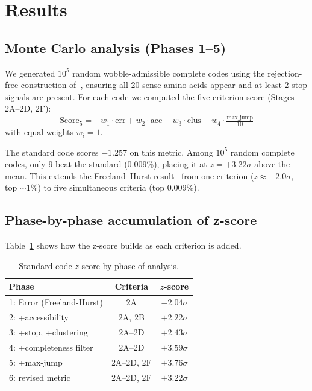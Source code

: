 \documentclass[10pt,twocolumn]{article}
\begin{document}
\section{Results}

\subsection{Monte Carlo analysis (Phases 1--5)}

We generated $10^5$ random wobble-admissible complete codes using the
rejection-free construction of~\cite{codon_code}, ensuring all 20 sense amino
acids appear and at least 2 stop signals are present. For each code we computed
the five-criterion score (Stages 2A--2D, 2F):
\[
\text{Score}_5 = -w_1 \cdot \text{err} + w_2 \cdot \text{acc} +
                 w_3 \cdot \text{clus} - w_4 \cdot \tfrac{\text{max\_jump}}{10}
\]
with equal weights $w_i = 1$.

The standard code scores $-1.257$ on this metric. Among $10^5$ random complete
codes, only 9 beat the standard (0.009\%), placing it at $z = +3.22\sigma$
above the mean. This extends the Freeland--Hurst result~\cite{FreelandHurst1998}
from one criterion ($z \approx -2.0\sigma$, top $\sim\!1\%$) to five
simultaneous criteria (top $0.009\%$).

\subsection{Phase-by-phase accumulation of z-score}

Table~\ref{tab:phases} shows how the z-score builds as each criterion is added.

\begin{table}[h]
\centering\small
\caption{Standard code $z$-score by phase of analysis.}
\label{tab:phases}
\begin{tabular}{@{}p{3.8cm}cc@{}}
\toprule
Phase & Criteria & $z$-score \\
\midrule
1: Error (Freeland-Hurst) & 2A & $-2.04\sigma$ \\
2: +accessibility & 2A, 2B & $+2.22\sigma$ \\
3: +stop, +clustering & 2A--2D & $+2.43\sigma$ \\
4: +completeness filter & 2A--2D & $+3.59\sigma$ \\
5: +max-jump & 2A--2D, 2F & $+3.76\sigma$ \\
6: revised metric & 2A--2D, 2F & $+3.22\sigma$ \\
\bottomrule
\end{tabular}
\end{table}
\end{document}
